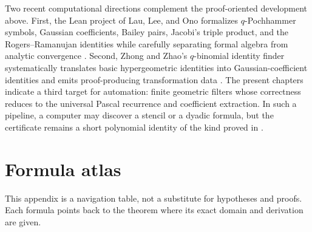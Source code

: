 \documentclass[11pt,oneside,openany]{book}
\theoremstyle{definition}
\theoremstyle{remark}
\begin{document}
Two recent computational directions complement the proof-oriented development above.  First, the Lean project of Lau, Lee, and Ono formalizes $q$-Pochhammer symbols, Gaussian coefficients, Bailey pairs, Jacobi's triple product, and the Rogers--Ramanujan identities while carefully separating formal algebra from analytic convergence \cite{LauLeeOno2026}.  Second, Zhong and Zhao's $q$-binomial identity finder systematically translates basic hypergeometric identities into Gaussian-coefficient identities and emits proof-producing transformation data \cite{ZhongZhao2024}.  The present chapters indicate a third target for automation: finite geometric filters whose correctness reduces to the universal Pascal recurrence and coefficient extraction.  In such a pipeline, a computer may discover a stencil or a dyadic formula, but the certificate remains a short polynomial identity of the kind proved in .


\appendix

\chapter{Formula atlas}\label{app:atlas}

This appendix is a navigation table, not a substitute for hypotheses and proofs.  Each formula points back to the theorem where its exact domain and derivation are given.

\end{document}
